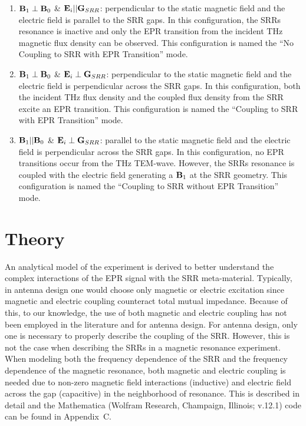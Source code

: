 \begin{enumerate}[label=(\Alph*)]
    \item $\textbf{B}_{1} \perp \textbf{B}_{0}$ \& $\textbf{E}_{i}||\textbf{G}_{SRR}$: perpendicular to the static magnetic field and the electric field is parallel to the SRR gaps. In this configuration, the SRRs resonance is inactive and only the EPR transition from the incident THz magnetic flux density can be observed. This configuration is named the ``No Coupling to SRR with EPR Transition'' mode. 
    \item $\textbf{B}_{1} \perp \textbf{B}_{0}$ \& $\textbf{E}_{i}\perp\textbf{G}_{SRR}$: perpendicular to the static magnetic field and the electric field is perpendicular across the SRR gaps. In this configuration, both the incident THz flux density and the coupled flux density from the SRR excite an EPR transition. This configuration is named the ``Coupling to SRR with EPR Transition'' mode.
    \item $\textbf{B}_{1} || \textbf{B}_{0}$ \& $\textbf{E}_{i}\perp\textbf{G}_{SRR}$: parallel to the static magnetic field and the electric field is perpendicular across the SRR gaps. In this configuration, no EPR transitions occur from the THz TEM-wave. However, the SRRs resonance is coupled with the electric field generating a $\textbf{B}_{1}$ at the SRR geometry. This configuration is named the ``Coupling to SRR without EPR Transition'' mode.
\end{enumerate}


\section{Theory}
An analytical model of the experiment is derived to better understand the complex interactions of the EPR signal with the SRR meta-material. Typically, in antenna design one would choose only magnetic \cite{srrmodel} or electric \cite{Katsarakis04} excitation since magnetic and electric coupling counteract total mutual impedance. Because of this, to our knowledge, the use of both magnetic and electric coupling has not been employed in the literature and for antenna design. For antenna design, only one is necessary to properly describe the coupling of the SRR. \cite{Baena2005,DurnSindreu2012,Bojanic2014,Su2015} However, this is not the case when describing the SRRs in a magnetic resonance experiment. When modeling both the frequency dependence of the SRR and the frequency dependence of the magnetic resonance, both magnetic and electric coupling is needed due to non-zero magnetic field interactions (inductive) and electric field across the gap (capacitive) in the neighborhood of resonance. This is described in detail and the Mathematica (Wolfram Research, Champaign, Illinois; v.12.1) code can be found in Appendix~C.

